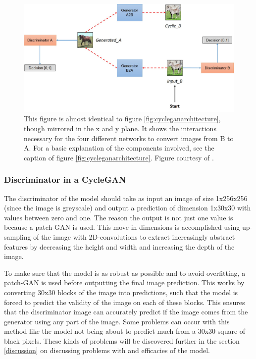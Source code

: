 \documentclass[12pt, fleqn, titlepage]{article}
\newcommand{\1}[1]{\mathds{1}\left[#1\right]}
\begin{document}
\begin{figure}[H]
	\centering
	\includegraphics[width=0.7\linewidth]{imgs/cyclegan_architecture2}
	\caption{This figure is almost identical to figure \ref{fig:cycleganarchitecture}, though mirrored in the x and y plane. It shows the interactions necessary for the four different networks to convert images from B to A. For a basic explanation of the components involved, see the caption of figure \ref{fig:cycleganarchitecture}. Figure courtesy of \cite{model_architecture}.}
	\label{fig:cycleganarchitecture2}
\end{figure}


\subsubsection{Discriminator in a CycleGAN}
The discriminator of the model should take as input an image of size 1x256x256 (since the image is greyscale) and output a prediction of dimension 1x30x30 with values between zero and one. The reason the output is not just one value is because a patch-GAN is used. This move in dimensions is accomplished using up-sampling of the image with 2D-convolutions to extract increasingly abstract features by decreasing the height and width and increasing the depth of the image.

To make sure that the model is as robust as possible and to avoid overfitting, a patch-GAN is used before outputting the final image prediction. This works by converting 30x30 blocks of the image into predictions, such that the model is forced to predict the validity of the image on each of these blocks. This ensures that the discriminator image can accurately predict if the image comes from the generator using any part of the image. Some problems can occur with this method like the model not being about to predict much from a 30x30 square of black pixels. These kinds of problems will be discovered further in the section \ref{discussion} on discussing problems with and efficacies of the model.
\end{document}
